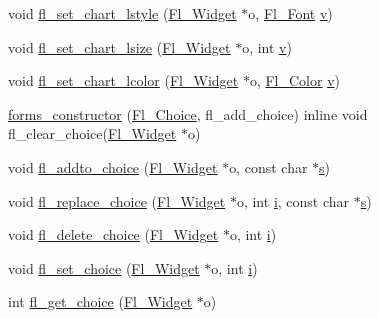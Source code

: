 \begin{DoxyCompactItemize}
\item 
void \hyperlink{forms_8_h_a7916801334802c0ab2459e8ef73887bf}{fl\+\_\+set\+\_\+chart\+\_\+lstyle} (\hyperlink{class_fl___widget}{Fl\+\_\+\+Widget} $\ast$o, \hyperlink{_enumerations_8_h_a2ac46d9f082834b969fffe490a03a709}{Fl\+\_\+\+Font} \hyperlink{forms_8_h_a3b90d5a73541ab9402511d87bed076ef}{v})
\item 
void \hyperlink{forms_8_h_a99097b52f87bee6c0ac3795d90da2ca1}{fl\+\_\+set\+\_\+chart\+\_\+lsize} (\hyperlink{class_fl___widget}{Fl\+\_\+\+Widget} $\ast$o, int \hyperlink{forms_8_h_a3b90d5a73541ab9402511d87bed076ef}{v})
\item 
void \hyperlink{forms_8_h_a1b9d678a060bb25a2e58ce6baef7d6f0}{fl\+\_\+set\+\_\+chart\+\_\+lcolor} (\hyperlink{class_fl___widget}{Fl\+\_\+\+Widget} $\ast$o, \hyperlink{_enumerations_8_h_a8b762953646f8abee866061f1af78a6a}{Fl\+\_\+\+Color} \hyperlink{forms_8_h_a3b90d5a73541ab9402511d87bed076ef}{v})
\item 
\hyperlink{forms_8_h_a9bfb20b0c547dd6c2bc52dab888c0a6b}{forms\+\_\+constructor} (\hyperlink{class_fl___choice}{Fl\+\_\+\+Choice}, fl\+\_\+add\+\_\+choice) inline void fl\+\_\+clear\+\_\+choice(\hyperlink{class_fl___widget}{Fl\+\_\+\+Widget} $\ast$o)
\item 
void \hyperlink{forms_8_h_a53899ceccc6722f1fc3e5321f885b002}{fl\+\_\+addto\+\_\+choice} (\hyperlink{class_fl___widget}{Fl\+\_\+\+Widget} $\ast$o, const char $\ast$\hyperlink{forms_8_h_a672b4f0a8c8a6db61068c721f799d87f}{s})
\item 
void \hyperlink{forms_8_h_ae40fbc9630f70d84d252d6f9090cd5f4}{fl\+\_\+replace\+\_\+choice} (\hyperlink{class_fl___widget}{Fl\+\_\+\+Widget} $\ast$o, int \hyperlink{forms_8_h_acb559820d9ca11295b4500f179ef6392}{i}, const char $\ast$\hyperlink{forms_8_h_a672b4f0a8c8a6db61068c721f799d87f}{s})
\item 
void \hyperlink{forms_8_h_adfdd660780957fd832ca57a7ee1af5e6}{fl\+\_\+delete\+\_\+choice} (\hyperlink{class_fl___widget}{Fl\+\_\+\+Widget} $\ast$o, int \hyperlink{forms_8_h_acb559820d9ca11295b4500f179ef6392}{i})
\item 
void \hyperlink{forms_8_h_a5a48eaa6ea0195643602298c33685b7f}{fl\+\_\+set\+\_\+choice} (\hyperlink{class_fl___widget}{Fl\+\_\+\+Widget} $\ast$o, int \hyperlink{forms_8_h_acb559820d9ca11295b4500f179ef6392}{i})
\item 
int \hyperlink{forms_8_h_a40671805ab41ceba73f9f05c08bd6872}{fl\+\_\+get\+\_\+choice} (\hyperlink{class_fl___widget}{Fl\+\_\+\+Widget} $\ast$o)
\item 

\end{DoxyCompactItemize}
